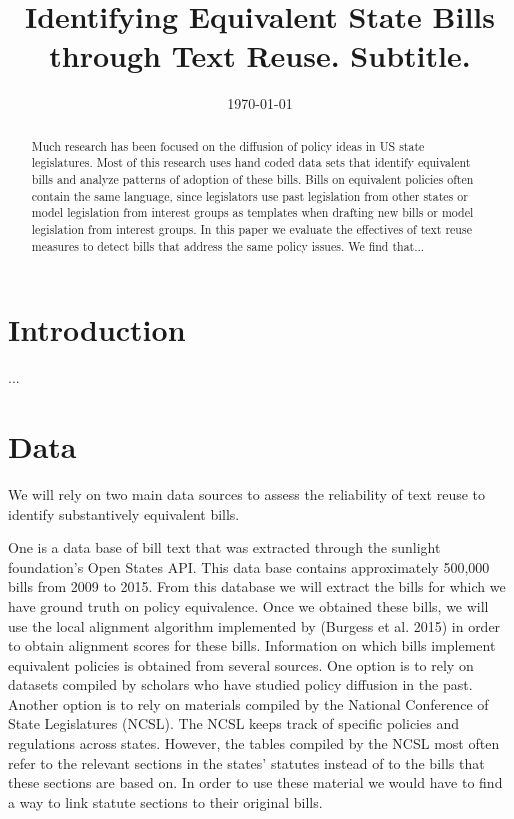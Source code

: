 \documentclass[12pt]{article} %
\begin{document}
 

\title{Identifying Equivalent State Bills through Text Reuse. \large Subtitle.}
\date{\today}
\author{}

\maketitle

\begin{abstract}
Much research has been focused on the diffusion of policy ideas in US state
legislatures. Most of this research uses hand coded data sets that identify
equivalent bills and analyze patterns of adoption of these bills. Bills on
equivalent policies often contain the same language, since legislators use past
legislation from other states or model legislation from interest groups as
templates when drafting new bills or model legislation from interest groups. In
this paper we evaluate the effectives of text reuse measures to detect bills
that address the same policy issues. We find that... 
\end{abstract}

\section{Introduction}

...


\section{Data}

We will rely on two main data sources to assess the reliability of text reuse to
identify substantively equivalent bills. 

One is a data base of bill text that was extracted through the sunlight
foundation's Open States API. This data base contains approximately 500,000
bills from 2009 to 2015. From this database we will extract the bills for which we
have ground truth on policy equivalence. 
Once we obtained these bills, we will use the local alignment algorithm
implemented by (Burgess et al. 2015) in order to obtain alignment scores for
these bills. 
Information on which bills implement equivalent policies is obtained from
several sources. One option is to rely on datasets compiled by scholars who have
studied policy diffusion in the past. Another option is to rely on materials
compiled by the National Conference of State Legislatures (NCSL). The NCSL keeps
track of specific policies and regulations across states. However, the tables
compiled by the NCSL most often refer to the relevant sections in the states'
statutes instead of to the bills that these sections are based on. In order to
use these material we would have to find a way to link statute sections to their
original bills. 







\end{document}
